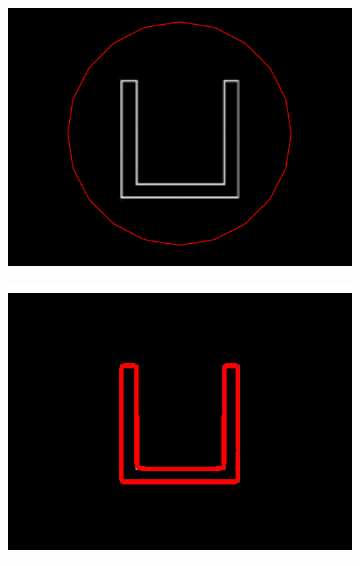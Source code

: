 \begin{figure}[H]
\begin{subfigure}[c]{0.3\linewidth}
\centering
\includegraphics[width=\textwidth]{Chapters/Images/Conc/sq}
\caption{}
\end{subfigure}
\begin{subfigure}[c]{0.3\linewidth}
\centering
\includegraphics[width=\textwidth]{Chapters/Images/Conc/gvfsq}
\caption{}
\end{subfigure}
\begin{subfigure}[c]{0.3\linewidth}
\centering

\end{subfigure}
\end{figure}

